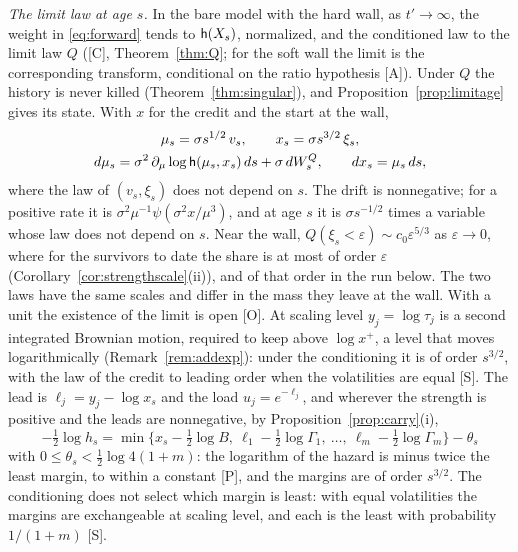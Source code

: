 \emph{The limit law at age $s$.} In the bare model with the hard wall, as
$t'\to\infty$, the weight in \eqref{eq:forward} tends to $\mathsf{h}(X_s)$,
normalized, and the conditioned law to the limit law $Q$ ([C], Theorem~\ref{thm:Q}; for
the soft wall the limit is the corresponding transform, conditional on
the ratio hypothesis [A]). Under $Q$ the history is never killed
(Theorem~\ref{thm:singular}), and Proposition~\ref{prop:limitage} gives its state. With $x$ for the credit and
the start at the wall,
\begin{equation}\label{eq:limitstate}
\begin{gathered}
\mu_s=\sigma s^{1/2}\,v_s,\qquad x_s=\sigma s^{3/2}\,\xi_s,\\
d\mu_s=\sigma^2\,\partial_\mu\log\mathsf{h}(\mu_s,x_s)\,ds+\sigma\,dW^Q_s,\qquad dx_s=\mu_s\,ds,
\end{gathered}
\end{equation}
where the law of $(v_s,\xi_s)$ does not depend on $s$. The drift is
nonnegative; for a positive rate it is
$\sigma^2\mu^{-1}\psi(\sigma^2x/\mu^3)$, and at age $s$ it is
$\sigma s^{-1/2}$ times a variable whose law does not depend on $s$.
Near the wall,
$Q(\xi_s<\varepsilon)\sim c_0\varepsilon^{5/3}$ as $\varepsilon\to0$,
where for the survivors to date the share is at most of order
$\varepsilon$ (Corollary~\ref{cor:strengthscale}(ii)), and of that order in the run below. The two
laws have the same scales and differ in the mass they leave at the wall. With a unit the existence of
the limit is open [O]. At scaling level $y_j=\log\tau_j$ is a second
integrated Brownian motion, required to keep above $\log x^+$, a level
that moves logarithmically (Remark~\ref{rem:addexp}): under the conditioning it is of
order $s^{3/2}$, with the law of the credit to leading order when the
volatilities are equal [S]. The lead is $\ell_j=y_j-\log x_s$ and the
load $u_j=e^{-\ell_j}$, and wherever the strength is positive and the
leads are nonnegative, by Proposition~\ref{prop:carry}(i),
\begin{equation}\label{eq:limithazard}
-\tfrac12\log h_s=\min\bigl\{x_s-\tfrac12\log B,\ \ell_1-\tfrac12\log\Gamma_1,\ \dots,\ \ell_m-\tfrac12\log\Gamma_m\bigr\}-\theta_s
\end{equation}
with $0\le\theta_s<\tfrac12\log4(1+m)$: the logarithm of the hazard is
minus twice the least margin, to within a constant [P], and the margins
are of order $s^{3/2}$. The conditioning does not select which margin is
least: with equal volatilities the margins are exchangeable at scaling
level, and each is the least with probability $1/(1+m)$ [S].

